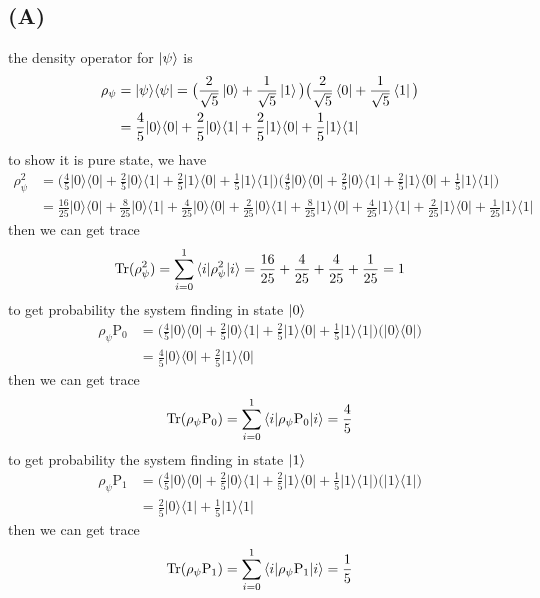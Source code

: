 \documentclass{article}
\newcommand{\op}[2]{|#1\rangle \langle#2|}
\newcommand{\sand}[3]{\braket{#1 | #2 | #3}}
\begin{document}
\subsection*{(A)}
the density operator for $\ket{\psi}$ is
\begin{align*}
    \rho_{\psi} &= \op{\psi}{\psi} = \big(\frac{2}{\sqrt{5}}\ket{0} + \frac{1}{\sqrt{5}}\ket{1}\big)\big(\frac{2}{\sqrt{5}}\bra{0} + \frac{1}{\sqrt{5}}\bra{1}\big) \\
    &= \frac{4}{5}\op{0}{0} + \frac{2}{5}\op{0}{1} + \frac{2}{5}\op{1}{0} + \frac{1}{5}\op{1}{1}
\end{align*}
to show it is pure state, we have
\begin{align*}
    \rho^2_{\psi} &= \big(\frac{4}{5}\op{0}{0} + \frac{2}{5}\op{0}{1} + \frac{2}{5}\op{1}{0} + \frac{1}{5}\op{1}{1}\big)\big(\frac{4}{5}\op{0}{0} + \frac{2}{5}\op{0}{1} + \frac{2}{5}\op{1}{0} + \frac{1}{5}\op{1}{1}\big) \\
    &= \frac{16}{25}\op{0}{0} + \frac{8}{25}\op{0}{1} + \frac{4}{25}\op{0}{0} + \frac{2}{25}\op{0}{1} + \frac{8}{25}\op{1}{0} + \frac{4}{25}\op{1}{1} + \frac{2}{25}\op{1}{0} + \frac{1}{25}\op{1}{1}
\end{align*}
then we can get trace 
\begin{align*}
    \text{Tr}(\rho^2_{\psi}) = \sum_{i=0}^{1} \sand{i}{\rho^2_{\psi}}{i} = \frac{16}{25} + \frac{4}{25} + \frac{4}{25} + \frac{1}{25} = 1
\end{align*}
to get probability the system finding in state $\ket{0}$
\begin{align*}
    \rho_{\psi}\text{P}_{0} &= \big(\frac{4}{5}\op{0}{0} + \frac{2}{5}\op{0}{1} + \frac{2}{5}\op{1}{0} + \frac{1}{5}\op{1}{1}\big)\big(\op{0}{0}\big) \\
    &= \frac{4}{5}\op{0}{0} + \frac{2}{5}\op{1}{0}
\end{align*}
then we can get trace 
\begin{align*}
    \text{Tr}(\rho_{\psi}\text{P}_{0}) = \sum_{i=0}^{1} \sand{i}{\rho_{\psi}\text{P}_{0}}{i} = \frac{4}{5}
\end{align*}
to get probability the system finding in state $\ket{1}$
\begin{align*}
    \rho_{\psi}\text{P}_{1} &= \big(\frac{4}{5}\op{0}{0} + \frac{2}{5}\op{0}{1} + \frac{2}{5}\op{1}{0} + \frac{1}{5}\op{1}{1}\big)\big(\op{1}{1}\big) \\
    &= \frac{2}{5}\op{0}{1} + \frac{1}{5}\op{1}{1}
\end{align*}
then we can get trace 
\begin{align*}
    \text{Tr}(\rho_{\psi}\text{P}_{1}) = \sum_{i=0}^{1} \sand{i}{\rho_{\psi}\text{P}_{1}}{i} = \frac{1}{5}
\end{align*}
\end{document}
